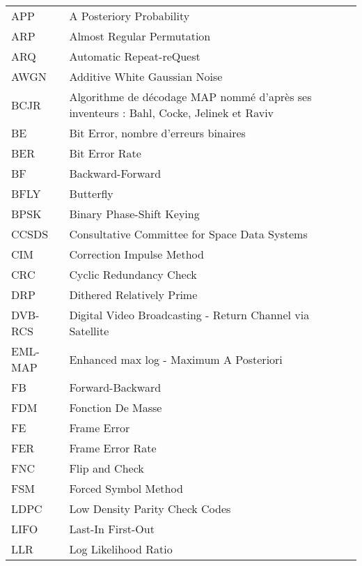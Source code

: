\begin{center}
\begin{longtable}{ p{}  p{} }
APP 		& 	A Posteriory Probability																			\\
ARP 		& 	Almost Regular Permutation 																			\\
ARQ 		& 	Automatic Repeat-reQuest	 																		\\
AWGN 		&   Additive White Gaussian Noise	 																	\\
BCJR 		&	Algorithme de décodage MAP nommé d'après ses inventeurs : Bahl, Cocke, Jelinek et Raviv				\\
BE 			& 	Bit Error, nombre d'erreurs binaires	 															\\
BER 		&   Bit Error Rate																						\\
BF 			&	Backward-Forward																					\\
BFLY 		&	Butterfly																							\\
BPSK 		&	Binary Phase-Shift Keying																			\\
CCSDS 		&   Consultative Committee for Space Data Systems														\\
CIM 		&  	Correction Impulse Method																			\\
CRC 		& 	Cyclic Redundancy Check 																			\\
DRP 		&   Dithered Relatively Prime																			\\
DVB-RCS 	&   Digital Video Broadcasting - Return Channel via Satellite	 										\\
EML-MAP 	&   Enhanced max log - Maximum A Posteriori																\\
FB 			&	Forward-Backward																					\\
FDM			&   Fonction De Masse																					\\
FE 			& 	Frame Error	 																						\\
FER 		&   Frame Error Rate																					\\
FNC 		&   Flip and Check																						\\
FSM 		&   Forced Symbol Method																				\\
LDPC 		& 	Low Density Parity Check Codes	 																	\\
LIFO 		& 	Last-In First-Out																					\\
LLR 		&  	Log Likelihood Ratio	 																			\\

\end{longtable}
\end{center}
